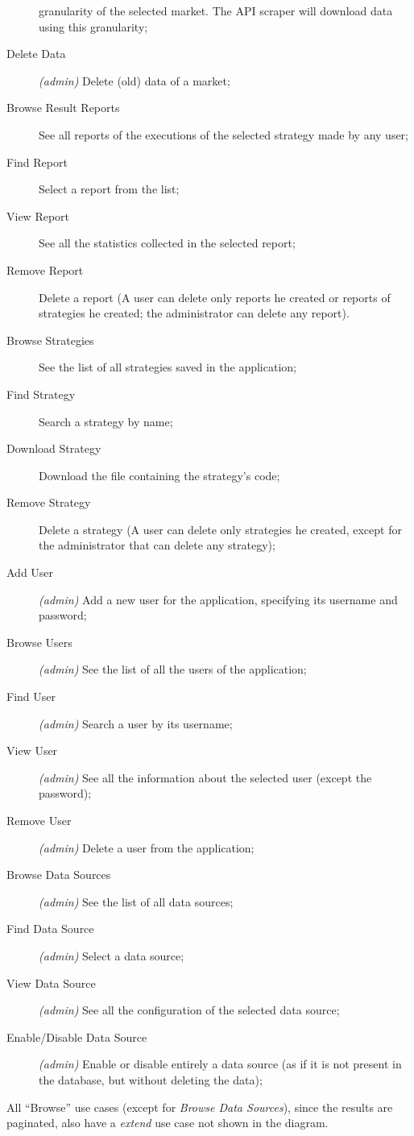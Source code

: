 \begin{description}
		granularity of the selected market. The API scraper will
		download data using this granularity;
	\item[Delete Data] \textit{(admin)} Delete (old) data of a market;
	\item[Browse Result Reports] See all reports of the executions of the
		selected strategy made by any user;
	\item[Find Report] Select a report from the list;
	\item[View Report] See all the statistics collected in the selected
		report;
	\item[Remove Report] Delete a report (A user can delete only reports he
		created or reports of strategies he created; the administrator
		can delete any report).
	\item[Browse Strategies] See the list of all strategies saved in the
		application;
	\item[Find Strategy] Search a strategy by name;
	\item[Download Strategy] Download the file containing the strategy's
		code;
	\item[Remove Strategy] Delete a strategy (A user can delete only
		strategies he created, except for the administrator that can
		delete any strategy);
	\item[Add User] \textit{(admin)} Add a new user for the application,
		specifying its username and password;
	\item[Browse Users] \textit{(admin)} See the list of all the users of
		the application;
	\item[Find User] \textit{(admin)} Search a user by its username;
	\item[View User] \textit{(admin)} See all the information about the
		selected user (except the password);
	\item[Remove User] \textit{(admin)} Delete a user from the application;
	\item[Browse Data Sources] \textit{(admin)} See the list of all data
		sources;
	\item[Find Data Source] \textit{(admin)} Select a data source;
	\item[View Data Source] \textit{(admin)} See all the configuration of
		the selected data source;
	\item[Enable/Disable Data Source] \textit{(admin)} Enable or disable
		entirely a data source (as if it is not present in the database,
		but without deleting the data);
\end{description}

All \enquote{Browse} use cases (except for \emph{Browse Data Sources}), since
the results are paginated, also have a 
\emph{extend} use case not shown in the diagram.
